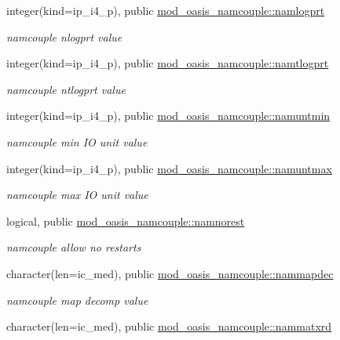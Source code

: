 \begin{DoxyCompactItemize}
integer(kind=ip\+\_\+i4\+\_\+p), public \hyperlink{namespacemod__oasis__namcouple_a46affda5336f60a1eeb1badaaccd3cfd}{mod\+\_\+oasis\+\_\+namcouple\+::namlogprt}
\begin{DoxyCompactList}\small\item\em namcouple nlogprt value \end{DoxyCompactList}\item 
integer(kind=ip\+\_\+i4\+\_\+p), public \hyperlink{namespacemod__oasis__namcouple_a45fbbd2941f5d71991d409f63e31cf02}{mod\+\_\+oasis\+\_\+namcouple\+::namtlogprt}
\begin{DoxyCompactList}\small\item\em namcouple ntlogprt value \end{DoxyCompactList}\item 
integer(kind=ip\+\_\+i4\+\_\+p), public \hyperlink{namespacemod__oasis__namcouple_a1b8c7ce28c62fa0b15076b7169d8b454}{mod\+\_\+oasis\+\_\+namcouple\+::namuntmin}
\begin{DoxyCompactList}\small\item\em namcouple min IO unit value \end{DoxyCompactList}\item 
integer(kind=ip\+\_\+i4\+\_\+p), public \hyperlink{namespacemod__oasis__namcouple_ae750107f9401fd3c7348088ad3095b45}{mod\+\_\+oasis\+\_\+namcouple\+::namuntmax}
\begin{DoxyCompactList}\small\item\em namcouple max IO unit value \end{DoxyCompactList}\item 
logical, public \hyperlink{namespacemod__oasis__namcouple_ad1bd3ea485ad5f5114eb4b7f8c831ccb}{mod\+\_\+oasis\+\_\+namcouple\+::namnorest}
\begin{DoxyCompactList}\small\item\em namcouple allow no restarts \end{DoxyCompactList}\item 
character(len=ic\+\_\+med), public \hyperlink{namespacemod__oasis__namcouple_a484aaf8a6d7eaa0675a8249fa94509cf}{mod\+\_\+oasis\+\_\+namcouple\+::nammapdec}
\begin{DoxyCompactList}\small\item\em namcouple map decomp value \end{DoxyCompactList}\item 
character(len=ic\+\_\+med), public \hyperlink{namespacemod__oasis__namcouple_ad9ac6585de157a05d793636addf672a5}{mod\+\_\+oasis\+\_\+namcouple\+::nammatxrd}

\end{DoxyCompactItemize}

